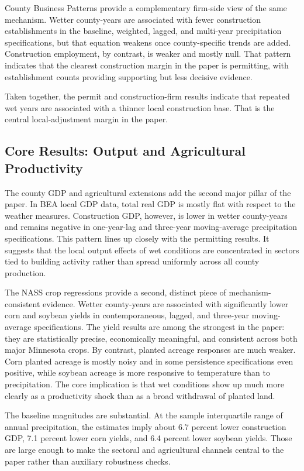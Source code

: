 \documentclass[12pt]{article}
\begin{document}
County Business Patterns provide a complementary firm-side view of the same mechanism. Wetter county-years are associated with fewer construction establishments in the baseline, weighted, lagged, and multi-year precipitation specifications, but that equation weakens once county-specific trends are added. Construction employment, by contrast, is weaker and mostly null. That pattern indicates that the clearest construction margin in the paper is permitting, with establishment counts providing supporting but less decisive evidence.

Taken together, the permit and construction-firm results indicate that repeated wet years are associated with a thinner local construction base. That is the central local-adjustment margin in the paper.

\subsection{Core Results: Output and Agricultural Productivity}

The county GDP and agricultural extensions add the second major pillar of the paper. In BEA local GDP data, total real GDP is mostly flat with respect to the weather measures. Construction GDP, however, is lower in wetter county-years and remains negative in one-year-lag and three-year moving-average precipitation specifications. This pattern lines up closely with the permitting results. It suggests that the local output effects of wet conditions are concentrated in sectors tied to building activity rather than spread uniformly across all county production.

The NASS crop regressions provide a second, distinct piece of mechanism-consistent evidence. Wetter county-years are associated with significantly lower corn and soybean yields in contemporaneous, lagged, and three-year moving-average specifications. The yield results are among the strongest in the paper: they are statistically precise, economically meaningful, and consistent across both major Minnesota crops. By contrast, planted acreage responses are much weaker. Corn planted acreage is mostly noisy and in some persistence specifications even positive, while soybean acreage is more responsive to temperature than to precipitation. The core implication is that wet conditions show up much more clearly as a productivity shock than as a broad withdrawal of planted land.

The baseline magnitudes are substantial. At the sample interquartile range of annual precipitation, the estimates imply about 6.7 percent lower construction GDP, 7.1 percent lower corn yields, and 6.4 percent lower soybean yields. Those are large enough to make the sectoral and agricultural channels central to the paper rather than auxiliary robustness checks.
\end{document}
